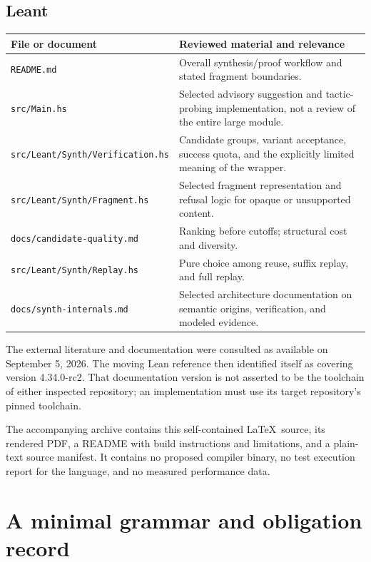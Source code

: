 \documentclass[11pt,a4paper]{article}
\newcommand{\code}[1]{\nolinkurl{#1}}
\theoremstyle{definition}
\theoremstyle{remark}
\numberwithin{equation}{section}
\begin{document}
\subsection*{Leant}
\begin{longtable}{@{}P{.36\linewidth}P{.58\linewidth}@{}}
\toprule
File or document & Reviewed material and relevance \\
\midrule
\endhead
\code{README.md} & Overall synthesis/proof workflow and stated fragment boundaries.\cite{l-readme} \\
\addlinespace
\code{src/Main.hs} & Selected advisory suggestion and tactic-probing implementation, not a review of the entire large module.\cite{l-main} \\
\addlinespace
\code{src/Leant/Synth/Verification.hs} & Candidate groups, variant acceptance, success quota, and the explicitly limited meaning of the wrapper.\cite{l-verification} \\
\addlinespace
\code{src/Leant/Synth/Fragment.hs} & Selected fragment representation and refusal logic for opaque or unsupported content.\cite{l-fragment} \\
\addlinespace
\code{docs/candidate-quality.md} & Ranking before cutoffs; structural cost and diversity.\cite{l-quality} \\
\addlinespace
\code{src/Leant/Synth/Replay.hs} & Pure choice among reuse, suffix replay, and full replay.\cite{l-replay} \\
\addlinespace
\code{docs/synth-internals.md} & Selected architecture documentation on semantic origins, verification, and modeled evidence.\cite{l-internals} \\
\bottomrule
\end{longtable}

The external literature and documentation were consulted as available on September 5, 2026. The moving Lean reference then identified itself as covering version 4.34.0-rc2. That documentation version is not asserted to be the toolchain of either inspected repository; an implementation must use its target repository's pinned toolchain.\cite{lean-reference}

The accompanying archive contains this self-contained \LaTeX\ source, its rendered PDF, a README with build instructions and limitations, and a plain-text source manifest. It contains no proposed compiler binary, no test execution report for the language, and no measured performance data.

\endgroup
\clearpage
\section{A minimal grammar and obligation record}
\label{app:grammar}
\end{document}
